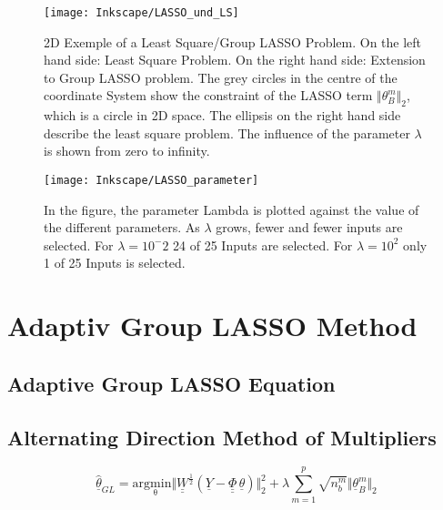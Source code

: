 \begin{figure}[!htb]
    \centering
    \texttt{[image: Inkscape/LASSO\_und\_LS]} %
    \caption[2D Example Least Square vs. Gruop LASSO]{2D Exemple of a Least Square/Group LASSO Problem. On the left hand side: Least Square Problem. On the right hand side: Extension to Group LASSO problem. The grey circles in the centre of the coordinate System show the constraint of the LASSO term $\Vert \theta^m_B \Vert_2$, which is a circle in 2D space. The ellipsis on the right hand side describe the least square problem. The influence of the parameter $\lambda$ is shown from zero to infinity.}
    \label{fig:2D_LASSO}
\end{figure}

\begin{figure}[!htb]
    \centering
    \texttt{[image: Inkscape/LASSO\_parameter]} %
    \caption[Influence of the $\lambda$ parameter]{In the figure, the parameter Lambda is plotted against the value of the different parameters. As $\lambda$ grows, fewer and fewer inputs are selected. For $\lambda = 10^-2$ 24 of 25 Inputs are selected. For $\lambda = 10^2$ only 1 of 25 Inputs is selected.
}
    \label{fig:LASSO_parameter}
\end{figure}

\section{Adaptiv Group LASSO Method}
\label{sec:Adaptive_Group_LASSO}

\subsection{Adaptive Group LASSO Equation}
\label{sec:Adaptive_GroupLassoEq}


\subsection{Alternating Direction Method of Multipliers}
\label{sec:ADMM}




 \begin{equation}
	\hat{\underline{\theta}}_{GL} = \mathrm{arg \underset{\theta} min} \Vert \underline{\underline{W}}^{\frac{1}{2}} (\underline{Y}-\underline{\underline{\Phi}} \, \underline{\theta}) \Vert^2_2 + \lambda \sum_{m=1}^p \sqrt{n^m_b} \Vert \underline{\theta}^m_B \Vert_2
	\label{eq:admm_gl}
\end{equation}


